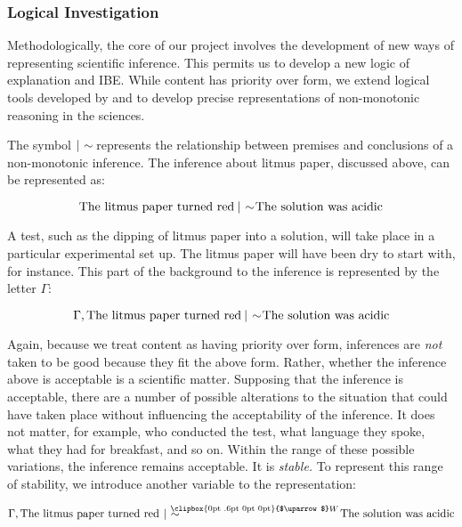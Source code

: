 \documentclass{article}[11pt]
\makeatletter
\newcommand{\uuparrow}{%
	\raisebox{.165ex}{\clipbox{0pt .6pt 0pt 0pt}{$\uparrow$}}
}
\newcommand{\tuuparrow}{%
	\raisebox{.165ex}{\clipbox{0pt 1pt 0pt 0pt}{$\scriptscriptstyle\uparrow$}}
}
\newcommand{\nms}{%
	\mathbin{\mathpalette\@nms\expandafter}
}
\newcommand{\@nms}{\mid\joinrel\mkern-.5mu\sim}
\newcommand{\nmc}{%
	\mathbin{\mathpalette\nm@\expandafter}
}
\newcommand{\nm@}{\mid\joinrel\mkern-.5mu\sim\mkern-3mu}
\newcommand{\qmc}[1]{\mathrel{
		\mathchoice
		{\normalsize\hspace{.4mm}\nms^{\mkern-18mu\scriptsize\uuparrow#1}\hspace{-.7mm}}
		{\normalsize\hspace{.4mm}\nms^{\mkern-18mu\scriptsize\uuparrow#1}\hspace{-.7mm}}
		{\footnotesize\hspace{.4mm}\nms^{\mkern-13mu\tiny\uuparrow#1}}
		{\scriptsize\nms^{\mkern-10mu\tiny\tuuparrow#1}}
	}
}
\makeatother
\begin{document}
\subsubsection*{Logical Investigation}

Methodologically, the core of our project involves the development of new ways of representing scientific inference.  This permits us to develop a new logic of explanation and IBE.  While content has priority over form, we extend logical tools developed by \textcite{Brandom2008} and \textcite{Hlobil2016} to develop precise representations of non-monotonic reasoning in the sciences.  

 The symbol $\nmc$ represents the relationship between premises and conclusions of a non-monotonic inference.  The inference about litmus paper, discussed above, can be represented as:

\vspace{-12pt}
\begin{equation*}
\textrm{The litmus paper turned red} \nmc \textrm{The solution was acidic}
\end{equation*}

\noindent A test, such as the dipping of litmus paper into a solution, will take place in a particular experimental set up.  The litmus paper will have been dry to start with, for instance.  This part of the background to the inference is represented by the letter $\Gamma$: 

\vspace{-12pt}
\begin{equation*}
\Gamma, \textrm{The litmus paper turned red} \nmc \textrm{The solution was acidic}
\end{equation*}

Again, because we treat content as having priority over form,  inferences are \textit{not} taken to be good because they fit the above form.  Rather, whether the inference above is acceptable is a scientific matter.  Supposing that the inference is acceptable, there are a number of possible alterations to the situation that could have taken place without influencing the acceptability of the inference.  It does not matter, for example, who conducted the test, what language they spoke, what they had for breakfast, and so on.  Within the range of these possible variations, the inference remains acceptable.  It is \textit{stable.}  To represent this range of stability, we introduce another variable to the representation:

\vspace{-12pt}
\begin{equation*}
\Gamma, \textrm{The litmus paper turned red} \qmc{W} \textrm{The solution was acidic}
\end{equation*}
\end{document}
